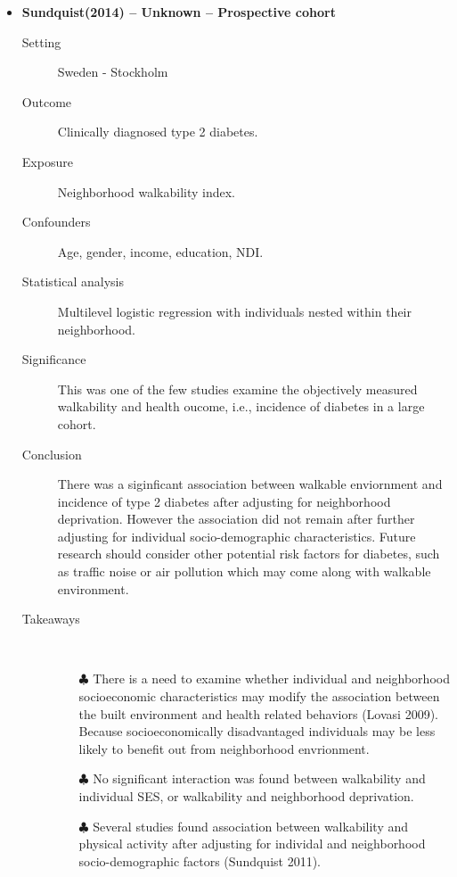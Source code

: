 \documentclass{article}
\begin{document}
\begin{itemize}
\item{\bf Sundquist(2014) -- Unknown  -- Prospective cohort} 
		\begin{description}
			\item[Setting] Sweden - Stockholm 
			\item[Outcome] Clinically diagnosed type 2 diabetes.
			\item[Exposure] Neighborhood walkability index.  
			\item[Confounders] Age, gender, income, education, NDI. 
			\item[Statistical analysis] Multilevel logistic regression with individuals nested within their neighborhood. 
			\item[Significance] This was one of the few studies examine the objectively measured walkability and health oucome, i.e., incidence of diabetes in a large cohort. 
			\item[Conclusion] There was a siginficant association between walkable enviornment and incidence of type 2 diabetes after adjusting for neighborhood deprivation. However the association did not remain after further adjusting for individual socio-demographic characteristics. Future research should consider other potential risk factors for diabetes, such as traffic noise or air pollution which may come along with walkable environment. 
			\item[Takeaways] \mbox{}\\
				\begin{itemize}
					\item[$\clubsuit$] There is a need to examine whether individual and neighborhood socioeconomic characteristics may modify the association between the built environment and health related behaviors (Lovasi 2009). Because socioeconomically disadvantaged individuals may be less likely to benefit out from neighborhood envrionment. 
					\item[$\clubsuit$] No significant interaction was found between walkability and individual SES, or walkability and neighborhood deprivation.
					\item[$\clubsuit$] Several studies found association between walkability and physical activity after adjusting for individal and neighborhood socio-demographic factors (Sundquist 2011). 
				\end{itemize} 
			
		\end{description}


\end{itemize}
\end{document}
